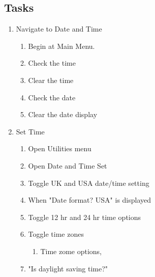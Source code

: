 \documentclass[10pt,letterpaper,twoside]{report}
\begin{document}
\subsection{Tasks}
\begin{enumerate}
	\item Navigate to Date and Time
	      \begin{enumerate}
		      \item Begin at Main Menu.
		      \item Check the time 
		      \item Clear the time 
		      \item Check the date 
		      \item Clear the date display 
	      \end{enumerate}
	\item Set Time
	      \begin{enumerate}
		      \item Open Utilities menu 
		      \item Open Date and Time Set 
		      \item Toggle UK and USA date/time setting 
		      \item When "Date format? USA" is displayed 
		      \item Toggle 12 hr and 24 hr time options 
		      \item Toggle time zones 
		            \begin{enumerate}
			            \item Time zome options, 
		            \end{enumerate}
		      \item "Is daylight saving time?" 

\end{enumerate}
\end{enumerate}
\end{document}
